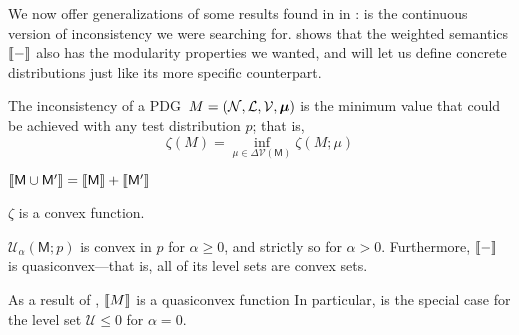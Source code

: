 \documentclass{article}
\newcommand{\commentout}[1]{\ignorespaces}
\newcommand{\bmu}{\boldsymbol{\mu}}
\newcommand{\V}{\mathcal V}
\newcommand{\sfM}{\mathsf M}
\newcommand{\MN}{PDG}
\numberwithin{equation}{section}
\begin{document}
{        
	We now offer generalizations of some results found in in
        :
         is the continuous version of
        inconsistency we were searching
        for.  shows that the
        weighted semantics $\llbracket-\rrbracket$ also has the modularity
        properties we wanted, and  will let us
        define concrete distributions just like its more specific
        counterpart. 
	
	\begin{defn}\label{def:cont-inconsist}
		The inconsistency of a \MN\ $M = (\cal N, L, V, \bmu)$ is the minimum value that could be achieved with any test distribution $p$; that is, 
		\[ \zeta(M) = \inf_{ \mu \in \Delta \V(\sfM)} \zeta (M; \mu) 
		\]		
	\end{defn}
	\begin{prop}[name=\Cref{prop:union-set-semantics} analog]\label{prop:union-weight-semantics}
		$\bbr{\sfM \cup \sfM'} = \bbr{\sfM} + \bbr{\sfM'}$
	\end{prop}
	\begin{lemma}[name=\Cref{prop:convex} analog, restate=thmzetaconvex]\label{thm:zetaconvex}
		$\zeta$ is a convex function. %
	\end{lemma}
	\begin{coro}\label{cor:u-convex}
		$\mathcal{U}_\alpha(\sfM; p)$ is convex in $p$ for $\alpha \geq 0$, and strictly so for $\alpha> 0$. Furthermore, $\llbracket-\rrbracket$ is quasiconvex---that is, all of its level sets are convex sets.
	\end{coro}

	As a result of , $\llbracket M\rrbracket$ is a quasiconvex function 
	In particular,  is the special case for the level set $\mathcal U \leq 0$ for $\alpha = 0$. 
	
}
	
\end{document}
